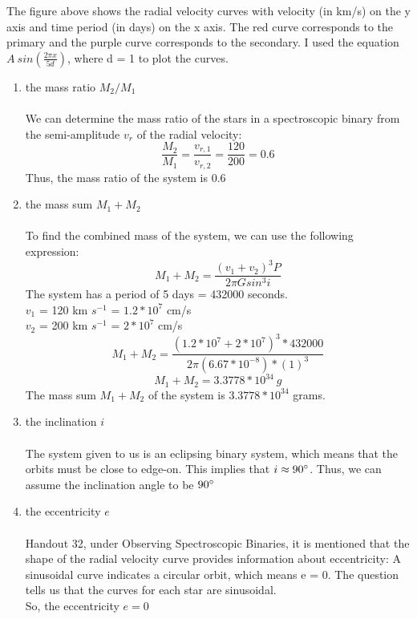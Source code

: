 \documentclass[10pt]{article}
\begin{document}
The figure above shows the radial velocity curves with velocity (in km/s) on the y axis and time period (in days) on the x axis. The red curve corresponds to the primary and the purple curve corresponds to the secondary. I used the equation $A \ sin(\frac{2 \pi x}{5d})$, where d = 1 to plot the curves.

\begin{enumerate} [label=(\alph*)]
    \item the mass ratio $M_{2}/M_{1}$ \\ \\
    We can determine the mass ratio of the stars in a spectroscopic binary from the semi-amplitude $v_{r}$ of the radial velocity:
    \[ \frac{M_{2}}{M_{1}} = \frac{v_{r,1}}{v_{r,2}} = \frac{120}{200} = 0.6\]
    Thus, the mass ratio of the system is 0.6

    \item the mass sum $M_{1} + M_{2}$ \\ \\
    To find the combined mass of the system, we can use the following expression:
    \[ M_{1} + M_{2} = \frac{(v_{1} + v_{2})^{3} P}{2 \pi G sin^{3}i}\]
    The system has a period of 5 days = 432000 seconds.\\
    $v_{1}$ = 120 km $s^{-1}$ = $1.2 * 10^{7}$ cm/s \\
    $v_{2}$ = 200 km $s^{-1}$ = $2 * 10^{7}$ cm/s
    \[ M_{1} + M_{2} = \frac{(1.2*10^{7} + 2 * 10^{7})^{3}* 432000}{2 \pi (6.67 * 10^{-8}) * (1)^{3}}\]
    \[ M_{1} + M_{2} = 3.3778 * 10^{34} \ g\]
    The mass sum $M_{1} + M_{2}$ of the system is $3.3778 * 10^{34}$ grams.

    \item the inclination $i$ \\ \\
    The system given to us is an eclipsing binary system, which means that the orbits must be close to edge-on. This implies that $ i \approx 90\degree$. Thus, we can assume the inclination angle to be $90 \degree$

    \item the eccentricity $e$ \\ \\
    Handout 32, under Observing Spectroscopic Binaries, it is mentioned that the shape of the radial velocity curve provides information about eccentricity: A sinusoidal curve indicates a circular orbit, which means e = 0. The question tells us that the curves for each star are sinusoidal.\\
    So, the eccentricity $e = 0$
\end{enumerate}
\end{document}
